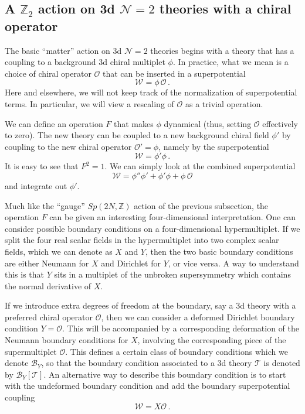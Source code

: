 \documentclass[hyper,letterpaper]{JHEP3}
\numberwithin{equation}{section}
\newcommand{\Z}{{\mathbb Z}}
\newcommand{\CB}{\mathcal{B}}
\newcommand{\CN}{\mathcal{N}}
\newcommand{\CO}{\mathcal{O}}
\newcommand{\CT}{\mathcal{T}}
\newcommand{\CW}{\mathcal{W}}
\begin{document}
\subsection{A $\Z_2$ action on 3d $\CN=2$ theories with a chiral operator}
\label{sec:F}

The basic ``matter'' action on 3d $\CN=2$ theories begins with a theory that has a coupling to a background 3d chiral multiplet $\phi$. In practice, what we mean is a choice of chiral operator $\CO$
that can be inserted in a superpotential
\begin{equation}
\CW = \phi\,\CO \,.
\end{equation}
Here and elsewhere, we will not keep track of the normalization of superpotential terms. In particular, we will view a rescaling of $\CO$ as a trivial operation.

We can define an operation $F$ that makes $\phi$ dynamical (thus, setting $\CO$ effectively to zero). The new theory can be coupled to a new background chiral field $\phi'$ by coupling to the new chiral operator $\CO'=\phi$, namely by the superpotential
\begin{equation}
\CW = \phi' \phi \,.
\end{equation}
It is easy to see that $F^2=1$. We can simply look at the combined superpotential
\begin{equation}
\CW = \phi'' \phi'+\phi' \phi +\phi\,\CO
\end{equation}
and integrate out $\phi'$.

Much like the ``gauge'' $Sp(2N,\Z)$ action of the previous subsection, the operation $F$ can be given an interesting four-dimensional interpretation. One can consider possible boundary conditions on a four-dimensional hypermultiplet. If we split the four real scalar fields in the hypermultiplet into two complex scalar fields, which we can denote as $X$ and $Y$, then the two basic boundary conditions are either Neumann for $X$ and Dirichlet for $Y$, or vice versa. A way to understand this is that $Y$ sits in a multiplet of the unbroken supersymmetry which contains the normal derivative of $X$.

If we introduce extra degrees of freedom at the boundary, say a 3d theory with a preferred chiral operator $\CO$,
then we can consider a deformed Dirichlet boundary condition $Y=\CO$. This will be accompanied by a
corresponding deformation of the Neumann boundary conditions for $X$, involving the corresponding piece of the supermultiplet $\CO$.
This defines a certain class of boundary conditions which we denote $\CB_Y$,
so that the boundary condition associated to a 3d theory $\CT$ is denoted by $\CB_Y[\CT]$.
An alternative way to describe this boundary condition is to start with the undeformed boundary condition
and add the boundary superpotential coupling
\begin{equation}
\CW = X \CO \,.
\end{equation}
\end{document}
